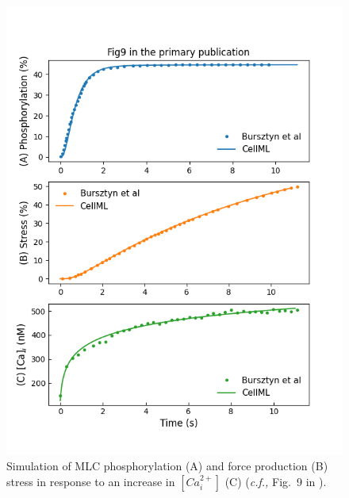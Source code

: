 \documentclass[fleqn,10pt]{physiome}
\begin{document}
\begin{figure}
\centering
\begin{minipage}[t]{\dimexpr.5\textwidth-0.2em}
  \centering
 \includegraphics[width=0.9\linewidth]{./figs/simFig9.png}
  \caption{Simulation of MLC phosphorylation (A) and force production (B) stress in response to an increase in $[Ca_{i}^{2+}]$ (C) (\emph{c.f.,} Fig.~9 in \citet{bursztyn2007mathematical}).}
  \label{simFig9}
\end{minipage}\hfill
\begin{minipage}[t]{\dimexpr.5\textwidth-0.2em}
  \centering

\end{minipage}
\end{figure}
\end{document}
